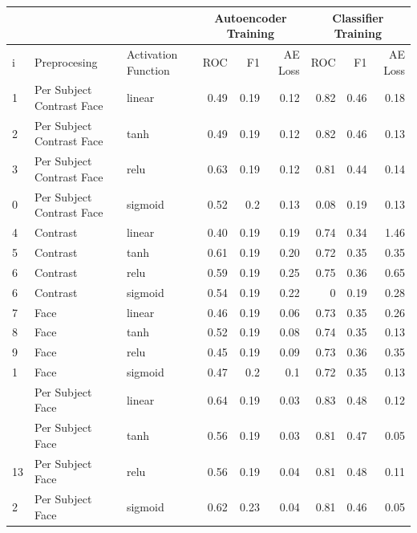 \begin{table}[!h] {\small
  \centering
\begin{tabular}{lllrrrrrr}
      && &   \multicolumn{3}{|c|}{Autoencoder Training} &  \multicolumn{3}{c|}{Classifier Training}    \\
  \hline
   i&Preprocesing    & Activation Function&  ROC&F1&AE Loss & ROC & F1 & AE Loss \\
   \hline
   1&Per Subject Contrast Face & linear &    0.49 &   0.19 &     0.12 &    0.82 &   0.46 &     0.18 \\
   2&Per Subject Contrast Face & tanh   &    0.49 &   0.19 &     0.12 &    0.82 &   0.46 &     0.13 \\
   3&Per Subject Contrast Face & relu   &    0.63 &   0.19 &     0.12 &    0.81 &   0.44 &     0.14 \\
   0 & Per Subject Contrast Face & sigmoid &    0.52 &   0.2  &     0.13 &    0.08 &   0.19 &     0.13 \\
   4&Contrast          & linear &    0.40 &   0.19 &     0.19 &    0.74 &   0.34 &     1.46 \\
   5&Contrast          & tanh   &    0.61 &   0.19 &     0.20 &    0.72 &   0.35 &     0.35 \\
   6&Contrast          & relu   &    0.59 &   0.19 &     0.25 &    0.75 &   0.36 &     0.65 \\
   6 & Contrast         & sigmoid &    0.54 &   0.19 &     0.22 &    0    &   0.19 &     0.28 \\
   7&Face              & linear &    0.46 &   0.19 &     0.06 &    0.73 &   0.35 &     0.26 \\
   8&Face              & tanh   &    0.52 &   0.19 &     0.08 &    0.74 &   0.35 &     0.13 \\
   9&Face              & relu   &    0.45 &   0.19 &     0.09 &    0.73 &   0.36 &     0.35 \\
   1 & Face             & sigmoid &    0.47 &   0.2  &     0.1  &    0.72 &   0.35 &     0.13 \\
   \hdashline
   11&Per Subject Face  & linear &    0.64 &   0.19 &     0.03 &    0.83 &   0.48 &     0.12 \\
   \hdashline
   12&Per Subject Face  & tanh   &    0.56 &   0.19 &     0.03 &    0.81 &   0.47 &     0.05 \\
   13&Per Subject Face  & relu   &    0.56 &   0.19 &     0.04 &    0.81 &   0.48 &     0.11 \\
   2 & Per Subject Face      & sigmoid &    0.62 &   0.23 &     0.04 &    0.81 &   0.46 &     0.05 \\

\end{tabular}}
\end{table}
